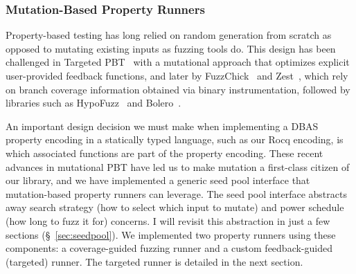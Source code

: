 \subsubsection{Mutation-Based Property Runners}

Property-based testing has long relied on random generation from scratch as opposed to
mutating existing inputs as fuzzing tools do. This design has been challenged in
Targeted PBT~\cite{TargetedPBT,AutomaticTargetedPBT} with a mutational approach that
optimizes explicit user-provided feedback functions, and later by
FuzzChick~\cite{FuzzChick} and Zest~\cite{Zest}, which rely on branch coverage
information obtained via binary instrumentation, followed by libraries such as
HypoFuzz~\cite{HypoFuzz} and Bolero~\cite{bolero}.

An important design decision we must make when implementing a DBAS property encoding in
a statically typed language, such as our Rocq encoding, is which associated functions
are part of the property encoding. These recent advances in mutational PBT have led us
to make mutation a first-class citizen of our library, and we have implemented a
generic seed pool interface that mutation-based property runners can leverage. The seed
pool interface abstracts away search strategy (how to select which input to mutate) and
power schedule (how long to fuzz it for) concerns. I will revisit this abstraction in
just a few sections (\S~\ref{sec:seedpool}). We implemented two property runners using
these components: a coverage-guided fuzzing runner and a custom feedback-guided
(targeted) runner. The targeted runner is detailed in the next section.

